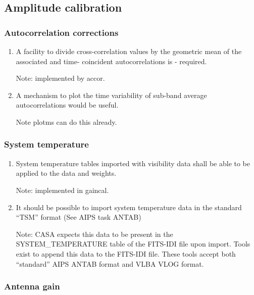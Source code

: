 \documentclass[11pt,a4paper]{article}
\begin{document}
\subsection{Amplitude calibration}

\subsubsection{Autocorrelation corrections}

\begin{enumerate}[subsubseclist]

\item A facility to divide cross-correlation values by the geometric
  mean of the associated and time- coincident autocorrelations is -
  required.

  Note: implemented by accor.

\item A mechanism to plot the time variability of sub-band average
  autocorrelations would be useful.

  Note plotms can do this already.
  
\end{enumerate}

\subsubsection{System temperature}

\begin{enumerate}[subsubseclist]

  \item System temperature tables imported with visibility data shall
    be able to be applied to the data and weights.

    Note: implemented in gaincal.

  \item It should be possible to import system temperature data in the
    standard ``TSM'' format (See AIPS task ANTAB)

    Note: CASA expects this data to be present in the
    SYSTEM\_TEMPERATURE table of the FITS-IDI file upon import.  Tools
    exist to append this data to the FITS-IDI file.  These tools
    accept both ``standard'' AIPS ANTAB format and VLBA VLOG format.

\end{enumerate}


\subsubsection{Antenna gain}
\end{document}
